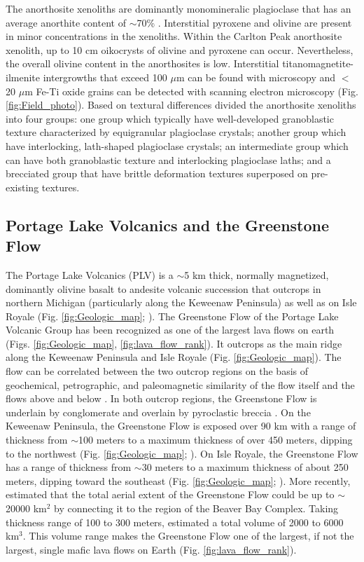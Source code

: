 \documentclass[draft]{agujournal2019}
\begin{document}
The anorthosite xenoliths are dominantly monomineralic plagioclase that has an average anorthite content of $\sim$70\% \cite{Morrison1983a, Doyle2016a}. Interstitial pyroxene and olivine are present in minor concentrations in the xenoliths. Within the Carlton Peak anorthosite xenolith, up to 10 cm oikocrysts of olivine and pyroxene can occur. Nevertheless, the overall olivine content in the anorthosites is low. Interstitial titanomagnetite-ilmenite intergrowths that exceed 100 $\mu$m can be found with microscopy and $<$20 $\mu$m Fe-Ti oxide grains can be detected with scanning electron microscopy (Fig. \ref{fig:Field_photo}). Based on textural differences  divided the anorthosite xenoliths into four groups: one group which typically have well-developed granoblastic texture characterized by equigranular plagioclase crystals; another group which have interlocking, lath-shaped plagioclase crystals; an intermediate group which can have both granoblastic texture and interlocking plagioclase laths; and a brecciated group that have brittle deformation textures superposed on pre-existing textures. 

\subsection{Portage Lake Volcanics and the Greenstone Flow}

The Portage Lake Volcanics (PLV) is a $\sim$5 km thick, normally magnetized, dominantly olivine basalt to andesite volcanic succession that outcrops in northern Michigan (particularly along the Keweenaw Peninsula) as well as on Isle Royale (Fig. \ref{fig:Geologic_map}; ). The Greenstone Flow of the Portage Lake Volcanic Group has been recognized as one of the largest lava flows on earth (Figs. \ref{fig:Geologic_map}, \ref{fig:lava_flow_rank}). It outcrops as the main ridge along the Keweenaw Peninsula and Isle Royale (Fig. \ref{fig:Geologic_map}). The flow can be correlated between the two outcrop regions on the basis of geochemical, petrographic, and paleomagnetic similarity of the flow itself and the flows above and below \cite{Longo1984a}. In both outcrop regions, the Greenstone Flow is underlain by conglomerate and overlain by pyroclastic breccia \cite{Lane1911a, Huber1973a}. On the Keweenaw Peninsula, the Greenstone Flow is exposed over 90 km with a range of thickness from $\sim$100 meters to a maximum thickness of over 450 meters, dipping to the northwest (Fig. \ref{fig:Geologic_map}; ). On Isle Royale, the Greenstone Flow has a range of thickness from $\sim$30 meters to a maximum thickness of about 250 meters, dipping toward the southeast (Fig. \ref{fig:Geologic_map}; ). More recently,  estimated that the total aerial extent of the Greenstone Flow could be up to $\sim$20000 km$^2$ by connecting it to the region of the Beaver Bay Complex. Taking thickness range of 100 to 300 meters,  estimated a total volume of 2000 to 6000 km$^3$. This volume range makes the Greenstone Flow one of the largest, if not the largest, single mafic lava ﬂows on Earth (Fig. \ref{fig:lava_flow_rank}).
\end{document}
